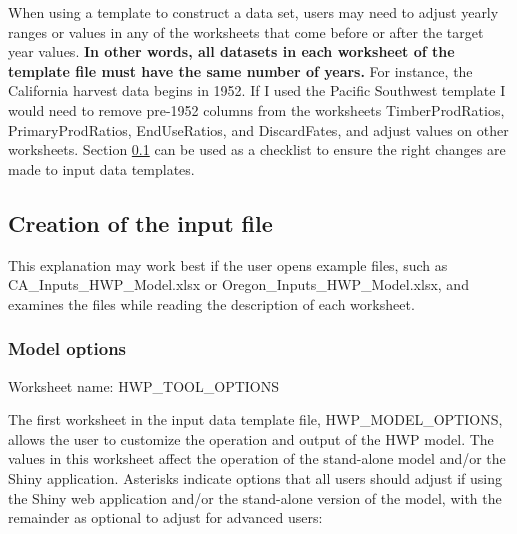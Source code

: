 \documentclass[
  openany]{book}
\begin{document}
When using a template to construct a data set, users may need to adjust yearly ranges or values in any of the worksheets that come before or after the target year values. \textbf{In other words, all datasets in each worksheet of the template file must have the same number of years.} For instance, the California harvest data begins in 1952. If I used the Pacific Southwest template I would need to remove pre-1952 columns from the worksheets TimberProdRatios, PrimaryProdRatios, EndUseRatios, and DiscardFates, and adjust values on other worksheets. Section \ref{own-prov-input} can be used as a checklist to ensure the right changes are made to input data templates.

\hypertarget{own-prov-input}{%
\subsection{Creation of the input file}\label{own-prov-input}}

This explanation may work best if the user opens example files, such as CA\_Inputs\_HWP\_Model.xlsx or Oregon\_Inputs\_HWP\_Model.xlsx, and examines the files while reading the description of each worksheet.

\hypertarget{own-prov-input-options}{%
\subsubsection{Model options}\label{own-prov-input-options}}

Worksheet name: HWP\_TOOL\_OPTIONS

The first worksheet in the input data template file, HWP\_MODEL\_OPTIONS, allows the user to customize the operation and output of the HWP model. The values in this worksheet affect the operation of the stand-alone model and/or the Shiny application. Asterisks indicate options that all users should adjust if using the Shiny web application and/or the stand-alone version of the model, with the remainder as optional to adjust for advanced users:
\end{document}
